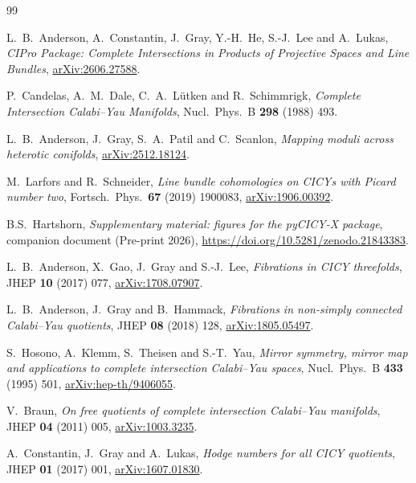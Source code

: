 \documentclass[11pt,a4paper]{article}
\theoremstyle{definition}
\begin{document}
\small
\begin{thebibliography}{99}
\setlength{\itemsep}{1pt plus 0.5pt}

L.~B.~Anderson, A.~Constantin, J.~Gray, Y.-H.~He, S.-J.~Lee and A.~Lukas,
\emph{CIPro Package: Complete Intersections in Products of Projective Spaces
and Line Bundles},
\href{https://arxiv.org/abs/2606.27588}{arXiv:2606.27588}.


P.~Candelas, A.~M.~Dale, C.~A.~L\"utken and R.~Schimmrigk,
\emph{Complete Intersection Calabi--Yau Manifolds},
Nucl.\ Phys.\ B \textbf{298} (1988) 493.

L.~B.~Anderson, J.~Gray, S.~A.~Patil and C.~Scanlon,
\emph{Mapping moduli across heterotic conifolds},
\href{https://arxiv.org/abs/2512.18124}{arXiv:2512.18124}.

M.~Larfors and R.~Schneider,
\emph{Line bundle cohomologies on CICYs with Picard number two},
Fortsch.\ Phys.\ \textbf{67} (2019) 1900083,
\href{https://arxiv.org/abs/1906.00392}{arXiv:1906.00392}.

B.S.~Hartshorn,
\emph{Supplementary material: figures for the pyCICY-X package},
companion document (Pre-print 2026), \url{https://doi.org/10.5281/zenodo.21843383}.

L.~B.~Anderson, X.~Gao, J.~Gray and S.-J.~Lee,
\emph{Fibrations in CICY threefolds},
JHEP \textbf{10} (2017) 077,
\href{https://arxiv.org/abs/1708.07907}{arXiv:1708.07907}.

L.~B.~Anderson, J.~Gray and B.~Hammack,
\emph{Fibrations in non-simply connected Calabi--Yau quotients},
JHEP \textbf{08} (2018) 128,
\href{https://arxiv.org/abs/1805.05497}{arXiv:1805.05497}.

S.~Hosono, A.~Klemm, S.~Theisen and S.-T.~Yau,
\emph{Mirror symmetry, mirror map and applications to complete intersection
Calabi--Yau spaces},
Nucl.\ Phys.\ B \textbf{433} (1995) 501,
\href{https://arxiv.org/abs/hep-th/9406055}{arXiv:hep-th/9406055}.

V.~Braun,
\emph{On free quotients of complete intersection Calabi--Yau manifolds},
JHEP \textbf{04} (2011) 005,
\href{https://arxiv.org/abs/1003.3235}{arXiv:1003.3235}.

A.~Constantin, J.~Gray and A.~Lukas,
\emph{Hodge numbers for all CICY quotients},
JHEP \textbf{01} (2017) 001,
\href{https://arxiv.org/abs/1607.01830}{arXiv:1607.01830}.


\end{thebibliography}
\end{document}
